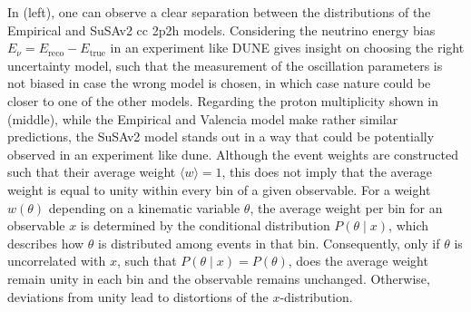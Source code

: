 %
In  (left), one can observe a clear separation between the distributions of the Empirical and SuSAv2 \acrshort{cc} \acrshort{2p2h} models. Considering the neutrino energy bias $E_\nu = E_\text{reco} - E_\text{true}$ in an experiment like DUNE gives insight on choosing the right uncertainty model, such that the measurement of the oscillation parameters is not biased in case the wrong model is chosen, in which case nature could be closer to one of the other models. Regarding the proton multiplicity shown in  (middle), while the Empirical and Valencia model make rather similar predictions, the SuSAv2 model stands out in a way that could be potentially observed in an experiment like \acrshort{dune}. %
%
Although the event weights are constructed such that their average weight $\langle w \rangle = 1$, this does not imply that the average weight is equal to unity within every bin of a given observable. For a weight $w(\theta)$ depending on a kinematic variable $\theta$, the average weight per bin for an observable $x$ is determined by the conditional distribution $P(\theta \mid x)$, which describes how $\theta$ is distributed among events in that bin. Consequently, only if $\theta$ is uncorrelated with $x$, such that $P(\theta \mid x) = P(\theta)$, does the average weight remain unity in each bin and the observable remains unchanged. Otherwise, deviations from unity lead to distortions of the $x$-distribution.

